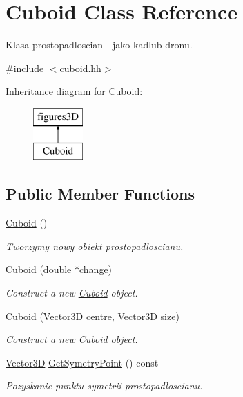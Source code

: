 \hypertarget{class_cuboid}{}\section{Cuboid Class Reference}
\label{class_cuboid}


Klasa prostopadloscian -\/ jako kadlub dronu.  




{\ttfamily \#include $<$cuboid.\+hh$>$}

Inheritance diagram for Cuboid\+:\begin{figure}[H]
\begin{center}
\leavevmode
\includegraphics[height=2.000000cm]{class_cuboid}
\end{center}
\end{figure}
\subsection*{Public Member Functions}
\begin{DoxyCompactItemize}
\item 
\hyperlink{class_cuboid_a1abf60e93d024b7a01ee5b1a48f1f08a}{Cuboid} ()
\begin{DoxyCompactList}\small\item\em Tworzymy nowy obiekt prostopadloscianu. \end{DoxyCompactList}\item 
\hyperlink{class_cuboid_abd381a00b4e6fd8375b6c801a9380e18}{Cuboid} (double $\ast$change)
\begin{DoxyCompactList}\small\item\em Construct a new \hyperlink{class_cuboid}{Cuboid} object. \end{DoxyCompactList}\item 
\hyperlink{class_cuboid_aeecc4924bc1456780b20c3048e3515f9}{Cuboid} (\hyperlink{vector3_d_8hh_a8790ef07836c1639da216f46501979c0}{Vector3D} centre, \hyperlink{vector3_d_8hh_a8790ef07836c1639da216f46501979c0}{Vector3D} size)
\begin{DoxyCompactList}\small\item\em Construct a new \hyperlink{class_cuboid}{Cuboid} object. \end{DoxyCompactList}\item 
\hyperlink{vector3_d_8hh_a8790ef07836c1639da216f46501979c0}{Vector3D} \hyperlink{class_cuboid_a1bd1aaaa5b60441acf5d75c56a7f3b53}{Get\+Symetry\+Point} () const 
\begin{DoxyCompactList}\small\item\em Pozyskanie punktu symetrii prostopadloscianu. \end{DoxyCompactList}\end{DoxyCompactItemize}
